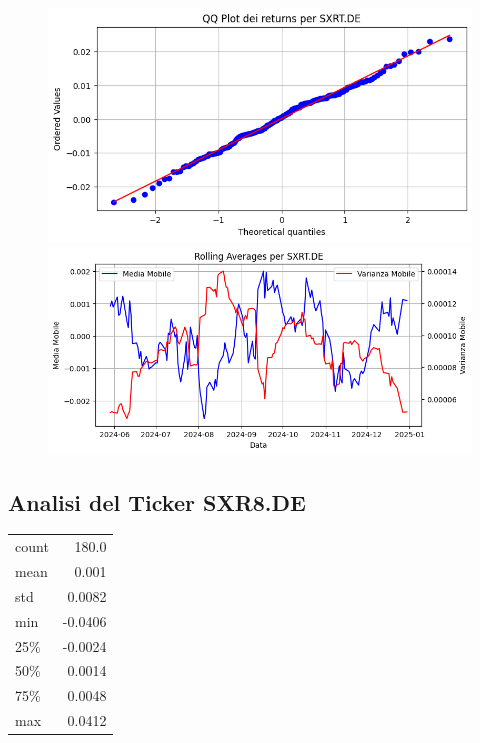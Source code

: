 \documentclass{article}%
\begin{document}
%


\begin{figure}[htbp]%
\begin{minipage}{0.48\textwidth}%
\includegraphics[width=\linewidth]{immagini_tickers/SXRT.DE_qq_plot.png}%
\end{minipage}%
\begin{minipage}{0.48\textwidth}%
\includegraphics[width=\linewidth]{immagini_tickers/SXRT.DE_rolling_averages.png}%
\end{minipage}%
\end{figure}

%
\subsection*{Analisi del Ticker SXR8.DE}%
\label{subsec:AnalisidelTickerSXR8.DE}%
\begin{tabular}{lr}%
count&180.0\\%
mean&0.001\\%
std&0.0082\\%
min&{-}0.0406\\%
25\%&{-}0.0024\\%
50\%&0.0014\\%
75\%&0.0048\\%
max&0.0412\\%
\end{tabular}%
\end{document}
